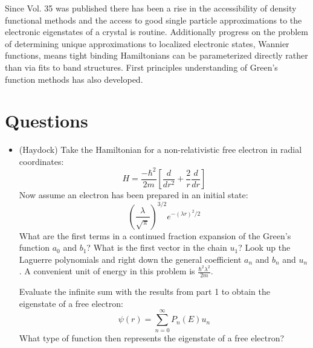 	Since Vol. 35 was published there has been a rise in the accessibility of density functional methods 
and the access to good single particle approximations to the electronic eigenstates of a crystal
is routine. Additionally progress on the problem of determining unique approximations to localized
electronic states, Wannier functions, means tight binding Hamiltonians can be parameterized directly
rather than via fits to band structures. First principles understanding of Green's function methods 
has also developed.

\section{Questions}
\begin{itemize}
\item (Haydock) Take the Hamiltonian for a non-relativistic free electron in radial coordinates:
\begin{equation}
H = \frac{-\hbar^{2}}{2m}[\frac{d}{dr^{2}}+ \frac{2}{r}\frac{d}{dr}]
\end{equation}
Now assume an electron has been prepared in an initial state:
\begin{equation}
(\frac{\lambda}{\sqrt{\pi}})^{3/2} e^{-(\lambda r)^{2}/2}
\end{equation}
What are the first terms in a continued fraction expansion of the Green's
function $a_{0}$ and $b_{1}$? What is the first vector in the chain $u_{1}$?
Look up the Laguerre polynomials and right down the general 
coefficient $a_{n}$ and $b_n$ and $u_{n}$. A convenient unit of 
energy in this problem is $\frac{\hbar^{2}\lambda^{2}}{2m}$.

Evaluate the infinite sum with the results from part 1 to obtain the eigenstate
of a free electron:
%
\begin{equation}
\psi(r) = \sum_{n=0}^{\infty}P_{n}(E)u_{n}
\end{equation}
%
What type of function then represents the eigenstate of a free electron?

\end{itemize}
%
